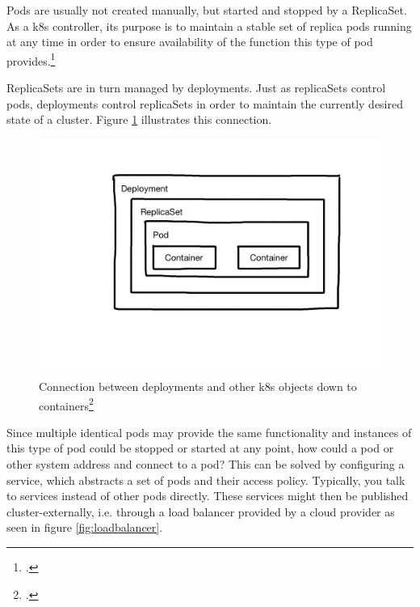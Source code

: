 Pods are usually not created manually, but started and stopped by a ReplicaSet. As a \gls{k8s} controller, its purpose is to maintain a stable set of replica pods running at any time in order to ensure availability of the function this type of pod provides.\footcite[][, introductory sentence]{k8sReplicaSets}

ReplicaSets are in turn managed by deployments. Just as replicaSets control pods, deployments control replicaSets in order to maintain the currently desired state of a cluster.
Figure \ref{fig:k8s-deployments} illustrates this connection.

\begin{figure}
\includegraphics[scale=0.2]{pictures/deployment.JPG} 
\caption{Connection between deployments and other \gls{k8s} objects down to containers\protect\footcite{nicoPictures}}
\label{fig:k8s-deployments}
\end{figure}

Since multiple identical pods may provide the same functionality and instances of this type of pod could be stopped or started at any point, how could a pod or other system address and connect to a pod? This can be solved by configuring a service, which abstracts a set of pods and their access policy. Typically, you talk to services instead of other pods directly. These services might then be published cluster-externally, i.e. through a load balancer provided by a cloud provider as seen in figure \ref{fig:loadbalancer}.

